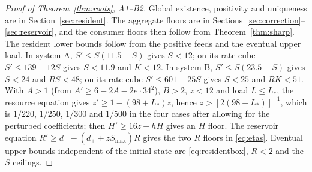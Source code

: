 \documentclass[11pt,a4paper]{article}
\theoremstyle{plain}
\theoremstyle{definition}
\theoremstyle{remark}
\begin{document}
\begin{proof}[Proof of Theorem~\ref{thm:roots}, A1--B2]
Global existence, positivity and uniqueness are in Section~\ref{sec:resident}. The aggregate floors are in Sections~\ref{sec:correction}--\ref{sec:reservoir}, and the consumer floors then follow from Theorem~\ref{thm:sharp}. The resident lower bounds follow from the positive feeds and the eventual upper load. In system A, $S'\le S(11.5-S)$ gives $S<12$; on its rate cube $S'\le139-12S$ gives $S<11.9$ and $K<12$. In system B, $S'\le S(23.5-S)$ gives $S<24$ and $RS<48$; on its rate cube $S'\le601-25S$ gives $S<25$ and $RK<51$. With $A>1$ (from $A'\ge6-2A-2e\cdot34^2$), $B>2$, $z<12$ and load $L\le L_*$, the resource equation gives $z'\ge1-(98+L_*)z$, hence $z>[2(98+L_*)]^{-1}$, which is $1/220$, $1/250$, $1/300$ and $1/500$ in the four cases after allowing for the perturbed coefficients; then $H'\ge16z-hH$ gives an $H$ floor. The reservoir equation $R'\ge d_--(d_++zS_{\max})R$ gives the two $R$ floors in \eqref{eq:etas}. Eventual upper bounds independent of the initial state are \eqref{eq:residentbox}, $R<2$ and the $S$ ceilings.
\end{proof}
\end{document}
